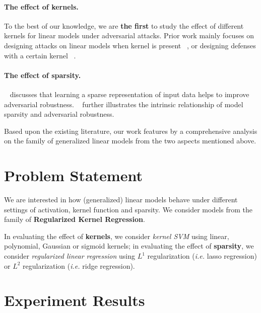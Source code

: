 \documentclass{article}
\begin{document}
\paragraph{The effect of kernels.} To the best of our knowledge, we are \textbf{the first} to study the effect of different kernels for linear models under adversarial attacks. Prior work mainly focuses on designing attacks on linear models when kernel is present ~\cite{biggio2011support}, or designing defenses with a certain kernel ~\cite{hao2019defending, taghanaki2019kernelized}.

\paragraph{The effect of sparsity.} ~\cite{gop2018combating} discusses that learning a sparse representation of input data helps to improve adversarial robustness. ~\cite{guo2018sparse} further illustrates the intrinsic relationship of model sparsity and adversarial robustness.

Based upon the existing literature, our work features by a comprehensive analysis on the family of generalized linear models from the two aspects mentioned above.



\section{Problem Statement}
We are interested in how (generalized) linear models behave under different settings of activation, kernel function and sparsity. We consider models from the family of \textbf{Regularized Kernel Regression}.

In evaluating the effect of \textbf{kernels}, we consider \textit{kernel SVM} using linear, polynomial, Gaussian or sigmoid kernels; in evaluating the effect of \textbf{sparsity}, we consider \textit{regularized linear regression} using $L^{1}$ regularization (\textit{i.e.} lasso regression) or $L^{2}$ regularization (\textit{i.e.} ridge regression).



\section{Experiment Results}
\end{document}
